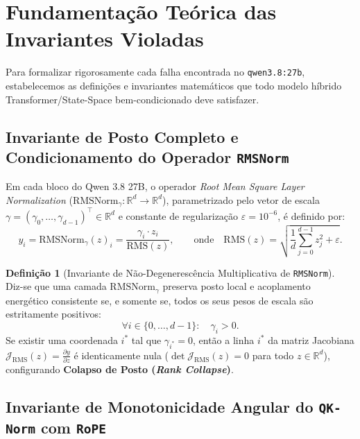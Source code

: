 \documentclass[11pt,a4paper]{article}
\theoremstyle{definition}
\newtheorem{definition}{Definição}
\begin{document}
\section{Fundamentação Teórica das Invariantes Violadas}

Para formalizar rigorosamente cada falha encontrada no \texttt{qwen3.8:27b}, estabelecemos as definições e invariantes matemáticos que todo modelo híbrido Transformer/State-Space bem-condicionado deve satisfazer.

\subsection{Invariante de Posto Completo e Condicionamento do Operador \texttt{RMSNorm}}

Em cada bloco do Qwen 3.8 27B, o operador \textit{Root Mean Square Layer Normalization} ($\text{RMSNorm}_\gamma: \mathbb{R}^d \to \mathbb{R}^d$), parametrizado pelo vetor de escala $\gamma = (\gamma_0, \dots, \gamma_{d-1})^\top \in \mathbb{R}^d$ e constante de regularização $\varepsilon = 10^{-6}$, é definido por:
\begin{equation}
    y_i = \text{RMSNorm}_\gamma(z)_i = \frac{\gamma_i \cdot z_i}{\text{RMS}(z)}, \qquad \text{onde} \quad \text{RMS}(z) = \sqrt{\frac{1}{d}\sum_{j=0}^{d-1} z_j^2 + \varepsilon}.
    \label{eq:rmsnorm_def}
\end{equation}

\begin{definition}[Invariante de Não-Degenerescência Multiplicativa de \texttt{RMSNorm}]
Diz-se que uma camada $\text{RMSNorm}_\gamma$ preserva posto local e acoplamento energético consistente se, e somente se, todos os seus pesos de escala são estritamente positivos:
\begin{equation}
    \forall i \in \{0, \dots, d-1\}: \quad \gamma_i > 0.
\end{equation}
Se existir uma coordenada $i^*$ tal que $\gamma_{i^*} = 0$, então a linha $i^*$ da matriz Jacobiana $\mathcal{J}_{\text{RMS}}(z) = \frac{\partial y}{\partial z}$ é identicamente nula ($\det \mathcal{J}_{\text{RMS}}(z) = 0$ para todo $z \in \mathbb{R}^d$), configurando \textbf{Colapso de Posto (\textit{Rank Collapse})}.
\end{definition}

\subsection{Invariante de Monotonicidade Angular do \texttt{QK-Norm} com \texttt{RoPE}}
\end{document}
